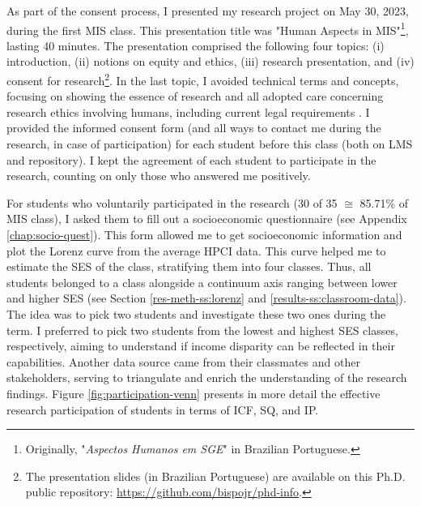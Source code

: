 As part of the consent process, I presented my research project on May 30, 2023, during the first \gls{MIS} class. This presentation title was "Human Aspects in MIS"\footnote{Originally, "\textit{Aspectos Humanos em SGE}" in Brazilian Portuguese.}, lasting 40 minutes. The presentation comprised the following four topics: (i) introduction, (ii) notions on equity and ethics, (iii) research presentation, and (iv) consent for research\footnote{The presentation slides (in Brazilian Portuguese) are available on this \gls{Ph.D.} public repository: \url{https://github.com/bispojr/phd-info}.}. In the last topic, I avoided technical terms and concepts, focusing on showing the essence of research and all adopted care concerning research ethics involving humans, including current legal requirements \cite{bispojr:2021-wei}. I provided the informed consent form (and all ways to contact me during the research, in case of participation) for each student before this class (both on \gls{LMS} and repository). I kept the agreement of each student to participate in the research, counting on only those who answered me positively.

For students who voluntarily participated in the research (30 of 35 $\cong$ 85.71\% of \gls{MIS} class), I asked them to fill out a socioeconomic questionnaire (see Appendix \ref{chap:socio-quest}). This form allowed me to get socioeconomic information and plot the Lorenz curve from the average \acrfull{HPCI} data. This curve helped me to estimate the \gls{SES} of the class, stratifying them into four classes. Thus, all students belonged to a class alongside a continuum axis ranging between lower and higher \gls{SES} (see Section \ref{res-meth-ss:lorenz} and \ref{results-ss:classroom-data}). The idea was to pick two students and investigate these two ones during the term. I preferred to pick two students from the lowest and highest SES classes, respectively, aiming to understand if income disparity can be reflected in their capabilities. Another data source came from their classmates and other stakeholders, serving to triangulate and enrich the understanding of the research findings. Figure \ref{fig:participation-venn} presents in more detail the effective research participation of students in terms of \gls{ICF}, \gls{SQ}, and \gls{IP}.

